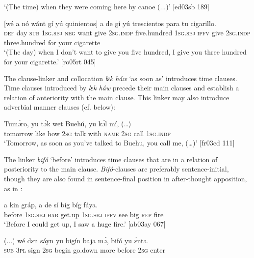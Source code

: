 \glt ‘(The time) when they were coming here by canoe (...)’ [ed03sb 189]
\z


\ea%
    \label{ex:key:1474}
    \gll {}    [wé  a    nó  wánt  gí  yú    quinientos]
a    de  gí  yú    trescientos    para    tu    cigarillo.\\
\textsc{def}  day   \textsc{sub}  \textsc{1sg.sbj}  \textsc{neg}  want  give  \textsc{2sg.indp}  five.hundred
\textsc{1sg.sbj}  \textsc{ipfv}  give  \textsc{2sg.indp}  three.hundred  for    your  cigarette\\

\glt ‘(The day) when I don’t want to give you five hundred, I give you 
three hundred for your cigarette.’ [ro05rt 045]
\z

The clause-linker and collocation\textit{ lɛk háw} ‘as soon as’ introduces time clauses. Time clauses introduced by \textit{lɛk háw} precede their main clauses and establish a relation of anteriority with the main clause. This linker may also introduce adverbial manner clauses (cf.  below): 


\ea%
    \label{ex:key:1475}
    \gll Tumɔ́ro,          yu  tɔ́k  wet    Buehú,  yu  kɔ́l  mí,    (…)\\
tomorrow  like  how    \textsc{2sg}  talk  with    \textsc{name}  \textsc{2sg}  call  \textsc{1sg.indp}\\

\glt ‘Tomorrow, as soon as you’ve talked to Buehu, you call me, (…)’ [fr03cd 111]
\z

The linker \textit{bifó} ‘before’ introduces time clauses that are in a relation of posteriority to the main clause. \textit{Bifó}{}-clauses are preferably sentence-initial, though they are also found in sentence-final position in after-thought apposition, as in : 


\ea%
    \label{ex:key:1476}
    \gll {}    a    kin  gráp,  a    de  sí  bíg  bíg  fáya.\\
before  \textsc{1sg.sbj}  \textsc{hab}  get.up  \textsc{1sg.sbj}  \textsc{ipfv}  see  big  \textsc{rep}  fire\\

\glt ‘Before I could get up, I saw a huge fire.’ [ab03ay 067]
\z


\ea%
    \label{ex:key:1477}
    \gll (...)  wé  dɛn  sáyn  yu  bigín  baja    mɔ́,    bifó    yu  ɛ́nta.\\
  \textsc{sub}  \textsc{3pl}  sign    \textsc{2sg}  begin  go.down  more  before  \textsc{2sg}  enter\\

